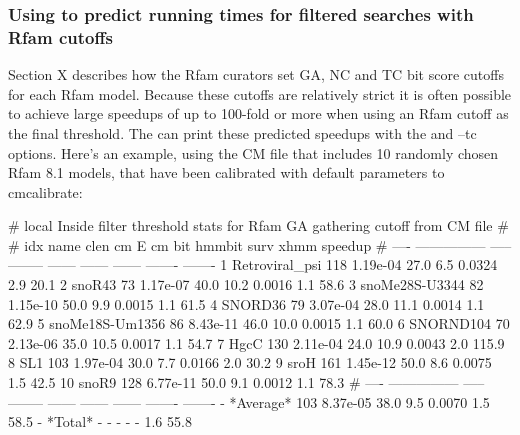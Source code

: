 \subsubsection{Using  to predict running times for
  filtered searches with Rfam cutoffs}
Section X describes how the Rfam curators set GA, NC and TC bit score
cutoffs for each Rfam model. Because these cutoffs are relatively
strict it is often possible to achieve large speedups of up to
100-fold or more when using an Rfam cutoff as the final threshold. The
 can print these predicted speedups with the  and {--tc} options. Here's an example, using the
 CM file that includes 10 randomly chosen Rfam
8.1 models, that have been calibrated with default parameters to
cmcalibrate:


\begin{sreoutput}
# local Inside filter threshold stats for Rfam GA gathering cutoff from CM file
#
#  idx  name              clen      cm E  cm bit  hmmbit    surv     xhmm  speedup
# ----  ---------------  -----  --------  ------  ------  ------  -------  -------
     1  Retroviral_psi     118  1.19e-04    27.0     6.5  0.0324      2.9     20.1
     2  snoR43              73  1.17e-07    40.0    10.2  0.0016      1.1     58.6
     3  snoMe28S-U3344      82  1.15e-10    50.0     9.9  0.0015      1.1     61.5
     4  SNORD36             79  3.07e-04    28.0    11.1  0.0014      1.1     62.9
     5  snoMe18S-Um1356     86  8.43e-11    46.0    10.0  0.0015      1.1     60.0
     6  SNORND104           70  2.13e-06    35.0    10.5  0.0017      1.1     54.7
     7  HgcC               130  2.11e-04    24.0    10.9  0.0043      2.0    115.9
     8  SL1                103  1.97e-04    30.0     7.7  0.0166      2.0     30.2
     9  sroH               161  1.45e-12    50.0     8.6  0.0075      1.5     42.5
    10  snoR9              128  6.77e-11    50.0     9.1  0.0012      1.1     78.3
# ----  ---------------  -----  --------  ------  ------  ------  -------  -------
     -  *Average*          103  8.37e-05    38.0     9.5  0.0070      1.5     58.5
     -  *Total*              -         -       -       -       -      1.6     55.8
\end{sreoutput}

